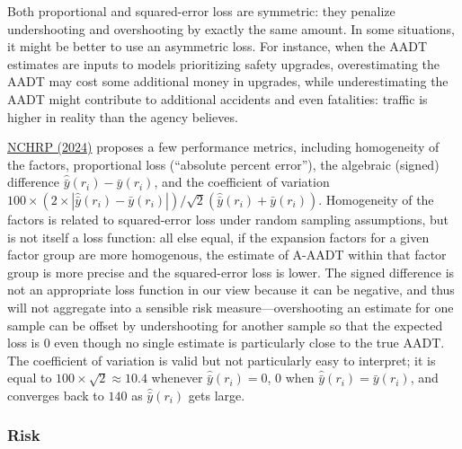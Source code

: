 \documentclass[11pt]{article}
\begin{document}
Both proportional and squared-error loss are symmetric: they penalize
undershooting and overshooting by exactly the same amount. In some
situations, it might be better to use an asymmetric loss. For instance,
when the AADT estimates are inputs to models prioritizing safety
upgrades, overestimating the AADT may cost some additional money in
upgrades, while underestimating the AADT might contribute to additional
accidents and even fatalities: traffic is higher in reality than the
agency believes.

\href{https://nap.nationalacademies.org/catalog/27925/guide-on-methods-for-assigning-counts-to-adjustment-factor-groups}{NCHRP
(2024)} proposes a few performance metrics, including homogeneity of the
factors, proportional loss (``absolute percent error''), the algebraic
(signed) difference \(\hat{\bar{y}}(r_i) - \bar{y}(r_i)\), and the
coefficient of variation
\(100 \times (2 \times |\hat{\bar{y}}(r_i) - \bar{y}(r_i)|) / \sqrt{2} (\hat{\bar{y}}(r_i) + \bar{y}(r_i))\).
Homogeneity of the factors is related to squared-error loss under random
sampling assumptions, but is not itself a loss function: all else equal,
if the expansion factors for a given factor group are more homogenous,
the estimate of A-AADT within that factor group is more precise and the
squared-error loss is lower. The signed difference is not an appropriate
loss function in our view because it can be negative, and thus will not
aggregate into a sensible risk measure---overshooting an estimate for
one sample can be offset by undershooting for another sample so that the
expected loss is 0 even though no single estimate is particularly close
to the true AADT. The coefficient of variation is valid but not
particularly easy to interpret; it is equal to
\(100 \times \sqrt{2} \approx 10.4\) whenever
\(\hat{\bar{y}}(r_i) = 0\), \(0\) when
\(\hat{\bar{y}}(r_i) = \bar{y}(r_i)\), and converges back to \(140\) as
\(\hat{\bar{y}}(r_i)\) gets large.

\subsubsection{Risk}\label{risk}
\end{document}
